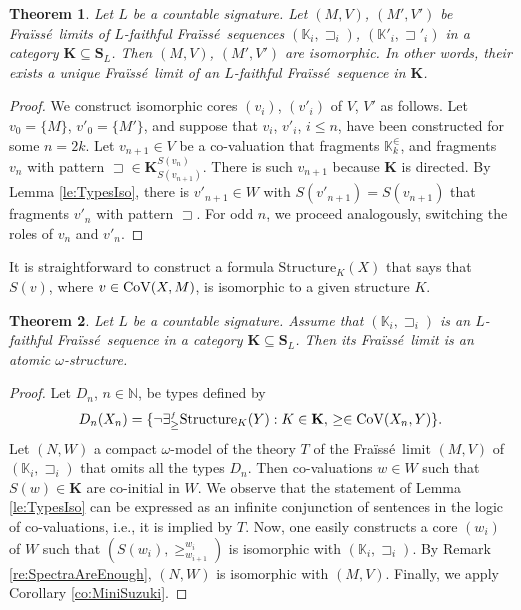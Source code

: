 \documentclass[12pt]{amsart}
\theoremstyle{plain}
\newtheorem{theorem}{Theorem}[section]
\newcommand \Val{{\rm{CoV}}}
\newcommand \sqsp{\sqsupset}
\newcommand \fra{Fra\"{i}ss\'{e}}
\newcommand \fr{\scriptscriptstyle{f}}
\newcommand \KKf{\mathbf{K}}
\newcommand \SSf{\mathbf{S}}
\newcommand \KKb{\mathbb{K}}
\newcommand \NN{\mathbb{N}}
\begin{document}
\begin{theorem}
	\label{th:FraAreIso}
	Let $L$ be a countable signature.  Let $(M,V)$, $(M',V')$ be \fra \ limits of $L$-faithful \fra \  sequences $(\KKb_i, \sqsp_i)$, $(\KKb'_i, \sqsp'_i)$ in a category $\KKf \subseteq \SSf_L$. Then $(M,V)$, $(M',V')$ are isomorphic. In other words, their exists a unique \fra \ limit of an $L$-faithful  \fra \  sequence in $\KKf$.
\end{theorem}

\begin{proof}
We construct isomorphic cores $(v_{i})$, $(v'_{i})$ of $V$, $V'$ as follows. Let $v_0=\{M\}$, $v'_0=\{M'\}$, and suppose that $v_i$, $v'_i$, $i \leq n$, have been constructed for some $n=2k$. Let $v_{n+1} \in V$ be a co-valuation that fragments $\KKb^\in_{k}$, and fragments $v_n$ with pattern $\sqsp \in \KKf^{S(v_n)}_{S(v_{n+1})}$. There is such $v_{n+1}$ because $\KKf$ is directed. By Lemma \ref{le:TypesIso},  there is $v'_{n+1} \in W$ with $S(v'_{n+1})=S(v_{n+1})$ that fragments $v'_n$ with pattern $\sqsp$. For odd $n$, we proceed analogously, switching the roles of $v_n$ and $v'_n$.
\end{proof}

It is straightforward to construct a formula $\mbox{Structure}_K(X)$ that says that $S(v)$, where $v \in \Val(X,M)$, is isomorphic to a given structure $K$.

\begin{theorem}
\label{th:FraAtomic}
	Let $L$ be a countable signature. 
	Assume that $(\KKb_i, \sqsp_i)$ is an $L$-faithful \fra \  sequence in a category $\KKf \subseteq \SSf_L$. Then its \fra \  limit is an atomic $\omega$-structure. 
\end{theorem}

\begin{proof}
Let $D_n$, $n \in \NN$, be types defined by
\[ D_n(X_n)=\{ \neg \exists^{\fr}_{\geq} \text{Structure}_K(Y): K \in \KKf, \, \geq \in \Val(X_n,Y) \}.\]
%		
Let $(N,W)$ a compact $\omega$-model of the theory $T$ of the \fra \ limit $(M,V)$ of $(\KKb_i, \sqsp_i)$ that omits all the types $D_n$. Then co-valuations $w \in W$ such that $S(w) \in \KKf$ are co-initial in $W$.  We observe that the statement of Lemma \ref{le:TypesIso} can be expressed as an infinite conjunction of sentences in the logic of co-valuations, i.e., it is implied by $T$. Now, one easily constructs a core $(w_i)$ of $W$ such that $(S(w_i), \geq^{w_i}_{w_{i+1}})$ is isomorphic with $(\KKb_i, \sqsp_i)$. By Remark \ref{re:SpectraAreEnough}, $(N,W)$ is isomorphic with $(M,V)$. Finally, we apply Corollary \ref{co:MiniSuzuki}.

\end{proof}
\end{document}
